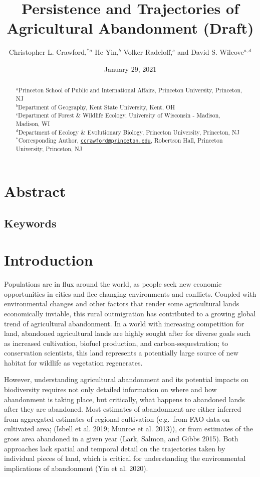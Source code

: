 \documentclass[
]{article}
\title{Persistence and Trajectories of Agricultural Abandonment (Draft)}
\author{Christopher L. Crawford,\(^*\)\(^a\) He Yin,\(^b\) Volker Radeloff,\(^c\) and David S. Wilcove\(^{a, d}\)}
\date{January 29, 2021}
\begin{document}
\maketitle
\begin{abstract}
\(^a\)Princeton School of Public and International Affairs, Princeton University, Princeton, NJ\\
\(^b\)Department of Geography, Kent State University, Kent, OH\\
\(^c\)Department of Forest \& Wildlife Ecology, University of Wisconsin - Madison, Madison, WI\\
\(^d\)Department of Ecology \& Evolutionary Biology, Princeton University, Princeton, NJ\\
\(^*\)Corresponding Author, \href{mailto:ccrawford@princeton.edu}{\nolinkurl{ccrawford@princeton.edu}}, Robertson Hall, Princeton University, Princeton, NJ
\end{abstract}

{
\setcounter{tocdepth}{2}
\tableofcontents
}
\hypertarget{abstract}{%
\section{Abstract}\label{abstract}}

\hypertarget{keywords}{%
\subsection{Keywords}\label{keywords}}

\hypertarget{introduction}{%
\section{Introduction}\label{introduction}}

Populations are in flux around the world, as people seek new economic opportunities in cities and flee changing environments and conflicts.
Coupled with environmental changes and other factors that render some agricultural lands economically inviable, this rural outmigration has contributed to a growing global trend of agricultural abandonment.
In a world with increasing competition for land, abandoned agricultural lands are highly sought after for diverse goals such as increased cultivation, biofuel production, and carbon-sequestration; to conservation scientists, this land represents a potentially large source of new habitat for wildlife as vegetation regenerates.

However, understanding agricultural abandonment and its potential impacts on biodiversity requires not only detailed information on where and how abandonment is taking place, but critically, what happens to abandoned lands after they are abandoned.
Most estimates of abandonment are either inferred from aggregated estimates of regional cultivation (e.g.~from FAO data on cultivated area; (Isbell et al. 2019; Munroe et al. 2013)), or from estimates of the gross area abandoned in a given year (Lark, Salmon, and Gibbs 2015).
Both approaches lack spatial and temporal detail on the trajectories taken by individual pieces of land, which is critical for understanding the environmental implications of abandonment (Yin et al. 2020).
\end{document}
